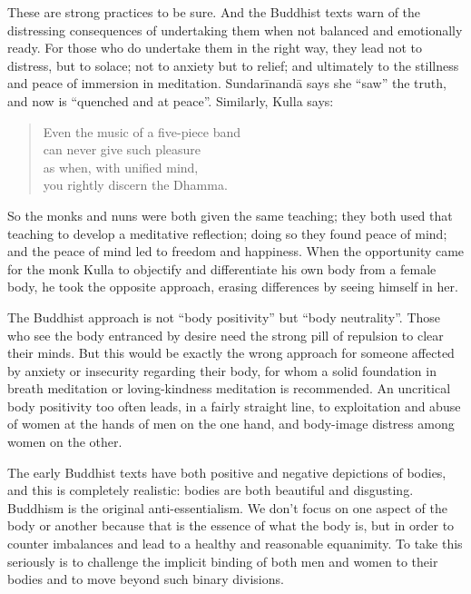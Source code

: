 \documentclass[12pt,openany]{book}%
\begin{document}
These are strong practices to be sure. And the Buddhist texts warn of the distressing consequences of undertaking them when not balanced and emotionally ready. For those who do undertake them in the right way, they lead not to distress, but to solace; not to anxiety but to relief; and ultimately to the stillness and peace of immersion in meditation. \textsanskrit{Sundarīnandā} says she “saw” the truth, and now is “quenched and at peace”. Similarly, Kulla says:

\begin{quotation}%
Even the music of a five-piece band\\

can never give such pleasure\\

as when, with unified mind,\\

you rightly discern the Dhamma.

%
\end{quotation}

So the monks and nuns were both given the same teaching; they both used that teaching to develop a meditative reflection; doing so they found peace of mind; and the peace of mind led to freedom and happiness. When the opportunity came for the monk Kulla to objectify and differentiate his own body from a female body, he took the opposite approach, erasing differences by seeing himself in her.

The Buddhist approach is not “body positivity” but “body neutrality”. Those who see the body entranced by desire need the strong pill of repulsion to clear their minds. But this would be exactly the wrong approach for someone affected by anxiety or insecurity regarding their body, for whom a solid foundation in breath meditation or loving-kindness meditation is recommended. An uncritical body positivity too often leads, in a fairly straight line, to exploitation and abuse of women at the hands of men on the one hand, and body-image distress among women on the other.  

The early Buddhist texts have both positive and negative depictions of bodies, and this is completely realistic: bodies are both beautiful and disgusting. Buddhism is the original anti-essentialism. We don’t focus on one aspect of the body or another because that is the essence of what the body is, but in order to counter imbalances and lead to a healthy and reasonable equanimity. To take this seriously is to challenge the implicit  binding of both men and women to their bodies and to move beyond such binary divisions. 
\end{document}
